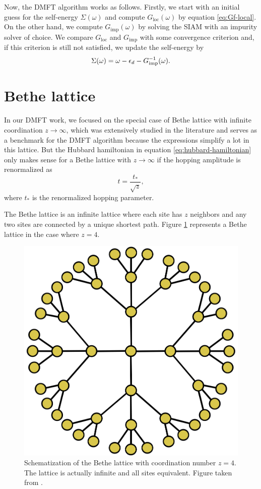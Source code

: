 \documentclass[12pt]{report}
\begin{document}
Now, the DMFT algorithm works as follows. Firstly, we start with an initial guess for the self-energy $\Sigma(\omega)$ and compute $G_{\text{loc}}(\omega)$ by equation \ref{eq:Gf-local}. On the other hand, we compute $G_{\text{imp}}(\omega)$ by solving the SIAM with an impurity solver of choice. We compare $G_{\text{loc}}$ and $G_{\text{imp}}$ with some convergence criterion and, if this criterion is still not satisfied, we update the self-energy by
\begin{equation} \label{eq:self-energy-update}
\Sigma(\omega) = \omega - \epsilon_d - G_{\text{imp}}^{-1}(\omega).
\end{equation}

\section{Bethe lattice} \label{sec:bethe}

In our DMFT work, we focused on the special case of Bethe lattice with infinite coordination $z\to\infty$, which was extensively studied in the literature \cite{georges1996, thesis_dmft_graz} and serves as a benchmark for the DMFT algorithm because the expressions simplify a lot in this lattice. But the Hubbard hamiltonian in equation \ref{eq:hubbard-hamiltonian} only makes sense for a Bethe lattice with $z\to\infty$ if the hopping amplitude is renormalized as \cite{thesis_bruno}
\begin{equation} \label{eq:hopping-renormalization}
t = \frac{t_*}{\sqrt{z}},
\end{equation}
where $t_*$ is the renormalized hopping parameter.

The Bethe lattice is an infinite lattice where each site has $z$ neighbors and any two sites are connected by a unique shortest path. Figure \ref{fig:bethe-lattice} represents a Bethe lattice in the case where $z = 4$.
\begin{figure}[H]
\centering
\includegraphics[width=0.4\linewidth]{fig/bethe-lattice.png}
\caption{Schematization of the Bethe lattice with coordination number $z = 4$. The lattice is actually infinite and all sites equivalent. Figure taken from \cite{thesis_dmft_graz}.}
\label{fig:bethe-lattice}
\end{figure}
\end{document}
